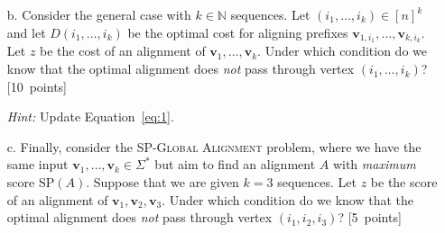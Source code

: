 \begin{enumerate}
\begin{itemize}
    \item[b.] Consider the general case with $k \in \mathbb{N}$ sequences. Let $(i_1,\ldots,i_k) \in [n]^k$ and let $D(i_1,\ldots,i_k)$ be the optimal cost for aligning prefixes $\mathbf{v}_{1,i_1},\ldots,\mathbf{v}_{k,i_k}$. Let $z$ be the cost of an alignment of $\mathbf{v}_1,\ldots,\mathbf{v}_k$. Under which condition do we know that the optimal alignment does \emph{not} pass through vertex $(i_1,\ldots,i_k)$? [10~points]
    
    \emph{Hint:} Update Equation~\eqref{eq:1}.
    

  \clearpage
    \item[c.] Finally, consider the \textsc{SP-Global Alignment} problem, where we have the same input $\mathbf{v}_1,\ldots,\mathbf{v}_k \in \Sigma^*$ but aim to find an alignment $A$ with \emph{maximum} score $\mathrm{SP}(A)$. Suppose that we are given $k=3$ sequences. Let $z$ be the score of an alignment of $\mathbf{v}_1,\mathbf{v}_2,\mathbf{v}_3$. Under which condition do we know that the optimal alignment does \emph{not} pass through vertex $(i_1,i_2,i_3)$? [5~points]
\vspace{1cm}
\end{itemize}


\end{enumerate}
